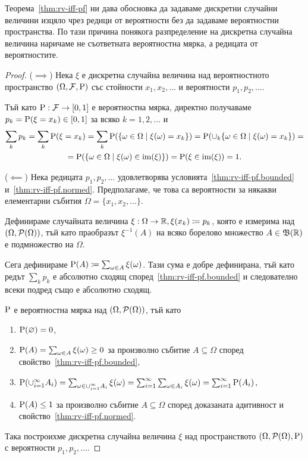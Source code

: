 \documentclass[numbers=endperiod, DIV=15, bibliography=totocnumbered]{scrartcl}
\begin{document}
Теорема~\ref{thm:rv-iff-pf} ни дава обосновка да задаваме дискретни случайни величини изцяло чрез редици от вероятности без да задаваме вероятностни пространства. По тази причина понякога разпределение на дискретна случайна величина наричаме не съответната вероятностна мярка, а редицата от вероятностите.

\begin{proof}
  ($\implies$) Нека $\xi$ е дискретна случайна величина над вероятностното пространство $(\Omega, \mathcal{F}, \operatorname{P})$ със стойности $x_1, x_2, \ldots$ и вероятности $p_1, p_2, \ldots$.

  Тъй като $\operatorname{P}: \mathcal{F} \to [0, 1]$ е вероятностна мярка, директно получаваме $p_k = \operatorname{P}(\xi = x_k) \in [0, 1]$ за всяко $k = 1, 2, \ldots$ и
  \begin{multline*}
    \sum_k p_k
    =
    \sum_k \operatorname{P}(\xi = x_k)
    =
    \sum_k \operatorname{P}(\{ \omega \in \Omega \mid \xi(\omega) = x_k \})
    =
    \operatorname{P}(\cup_k \{ \omega \in \Omega \mid \xi(\omega) = x_k \})
    = \\ =
    \operatorname{P}(\{ \omega \in \Omega \mid \xi(\omega) \in \operatorname{im}(\xi) \})
    =
    \operatorname{P}(\xi \in \operatorname{im}(\xi))
    =
    1.
  \end{multline*}

  ($\impliedby$) Нека редицата $p_1, p_2, \ldots$ удовлетворява условията~\ref{thm:rv-iff-pf.bounded} и~\ref{thm:rv-iff-pf.normed}. Предполагаме, че това са вероятности за някакви елементарни събития $\Omega = \{ x_1, x_2, \ldots \}$.

  Дефинираме случайната величина $\xi: \Omega \to \mathbb{R}, \xi(x_k) \coloneqq p_k$, която е измерима над $(\Omega, \mathcal{P}(\Omega))$, тъй като праобразът $\xi^{-1}(A)$ на всяко борелово множество $A \in \mathfrak{B}(\mathbb{R})$ е подмножество на $\Omega$.

  Сега дефинираме $\operatorname{P}(A) \coloneqq \sum_{\omega \in A} \xi(\omega)$. Тази сума е добре дефинирана, тъй като редът $\sum_k p_k$ е абсолютно сходящ според~\ref{thm:rv-iff-pf.bounded} и следователно всеки подред също е абсолютно сходящ.

  $\operatorname{P}$ е вероятностна мярка над $(\Omega, \mathcal{P}(\Omega))$, тъй като
  \begin{enumerate}
    \item $\operatorname{P}(\varnothing) = 0$,
    \item $\operatorname{P}(A) = \sum_{\omega \in A} \xi(\omega) \geq 0$ за произволно събитие $A \subseteq \Omega$ според свойство~\ref{thm:rv-iff-pf.bounded},
    \item $\operatorname{P}(\cup_{i=1}^\infty A_i) = \sum_{\omega \in \cup_{i=1}^\infty A_i} \xi(\omega) = \sum_{i=1}^\infty \sum_{\omega \in A_i} \xi(\omega) = \sum_{i=1}^\infty \operatorname{P}(A_i)$,
    \item $\operatorname{P}(A) \leq 1$ за произволно събитие $A \subseteq \Omega$ според доказаната адитивност и свойство~\ref{thm:rv-iff-pf.normed}.
  \end{enumerate}
  Така построихме дискретна случайна величина $\xi$ над пространството $(\Omega, \mathcal{P}(\Omega), \operatorname{P})$ с вероятности $p_1, p_2, \ldots$.
\end{proof}
\end{document}
